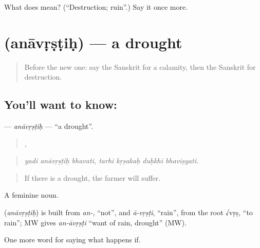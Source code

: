 \begin{tcolorbox}[breakable,colback=teal!4,colframe=teal!35!black,title={Before you move on}]
What does  mean? (\textquotedblleft{}Destruction; ruin\textquotedblright{}.) Say it once more.
\end{tcolorbox}
\section[\texorpdfstring{\sk{अनावृष्टिः} (anāvṛṣṭiḥ)}{अनावृष्टिः (anāvṛṣṭiḥ)}]{ (anāvṛṣṭiḥ) — a drought}

\label{lesson:SA-C375-anavrstih}



\begin{quote}
Before the new one: say the Sanskrit for a calamity, then the Sanskrit for destruction.
\end{quote}

\subsection*{You'll want to know: }
\textbf{} — \emph{anāvṛṣṭiḥ} — \textquotedblleft{}a drought\textquotedblright{}.

\begin{quote}
  ,    
\end{quote}

\begin{quote}
\emph{yadi anāvṛṣṭiḥ bhavati, tarhi kṛṣakaḥ duḥkhī bhaviṣyati.}
\end{quote}

\begin{quote}
If there is a drought, the farmer will suffer.
\end{quote}

A feminine noun.

\begin{cousinweb}
\textbf{} (\emph{anāvṛṣṭiḥ}) is built from \emph{an-}, \textquotedblleft{}not\textquotedblright{}, and \emph{ā-vṛṣṭi}, \textquotedblleft{}rain\textquotedblright{}, from the root √vṛṣ, \textquotedblleft{}to rain\textquotedblright{}; MW gives \emph{an-āvṛṣṭi} \textquotedblleft{}want of rain, drought\textquotedblright{} (MW).
\end{cousinweb}

\begin{grammarlens}[title={What you've built}]
One more word for saying what happens if.
\end{grammarlens}

